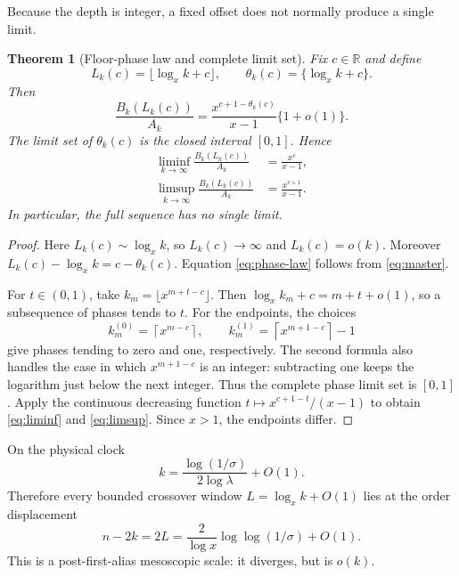 \documentclass[11pt]{article}
\newtheorem{theorem}{Theorem}[section]
\theoremstyle{remark}
\begin{document}
Because the depth is integer, a fixed offset does not normally produce a
single limit.

\begin{theorem}[Floor-phase law and complete limit set]
\label{thm:integer-phase}
Fix $c\in\mathbb R$ and define
\begin{equation}\label{eq:floor-phase}
 L_k(c)=\lfloor\log_xk+c\rfloor,
 \qquad
 \theta_k(c)=\{\log_xk+c\}.
\end{equation}
Then
\begin{equation}\label{eq:phase-law}
 \boxed{
 \frac{B_k(L_k(c))}{A_k}
 =\frac{x^{c+1-\theta_k(c)}}{x-1}\{1+o(1)\}.}
\end{equation}
The limit set of $\theta_k(c)$ is the closed interval $[0,1]$.  Hence
\begin{align}
 \liminf_{k\to\infty}\frac{B_k(L_k(c))}{A_k}
 &=\frac{x^c}{x-1},
 \label{eq:liminf}\\
 \limsup_{k\to\infty}\frac{B_k(L_k(c))}{A_k}
 &=\frac{x^{c+1}}{x-1}.
 \label{eq:limsup}
\end{align}
In particular, the full sequence has no single limit.
\end{theorem}

\begin{proof}
Here $L_k(c)\sim\log_xk$, so $L_k(c)\to\infty$ and $L_k(c)=o(k)$.
Moreover
$L_k(c)-\log_xk=c-\theta_k(c)$.  Equation \eqref{eq:phase-law} follows
from \eqref{eq:master}.

For $t\in(0,1)$, take
$k_m=\lfloor x^{m+t-c}\rfloor$.  Then
$\log_xk_m+c=m+t+o(1)$, so a subsequence of phases tends to $t$.
For the endpoints, the choices
\begin{equation}\label{eq:phase-endpoint-subsequences}
 k_m^{(0)}=\left\lceil x^{m-c}\right\rceil,
 \qquad
 k_m^{(1)}=\left\lceil x^{m+1-c}\right\rceil-1
\end{equation}
give phases tending to zero and one, respectively.  The second formula also
handles the case in which $x^{m+1-c}$ is an integer: subtracting one keeps
the logarithm just below the next integer.  Thus the complete phase limit
set is $[0,1]$.  Apply the continuous decreasing function
$t\mapsto x^{c+1-t}/(x-1)$ to obtain \eqref{eq:liminf} and
\eqref{eq:limsup}.  Since $x>1$, the endpoints differ.
\end{proof}

On the physical clock
\begin{equation}\label{eq:physical-clock}
 k=\frac{\log(1/\sigma)}{2\log\lambda}+O(1).
\end{equation}
Therefore every bounded crossover window $L=\log_xk+O(1)$ lies at the
order displacement
\begin{equation}\label{eq:physical-depth}
 n-2k=2L
 =\frac{2}{\log x}\log\log(1/\sigma)+O(1).
\end{equation}
This is a post-first-alias mesoscopic scale: it diverges, but is
$o(k)$.
\end{document}
